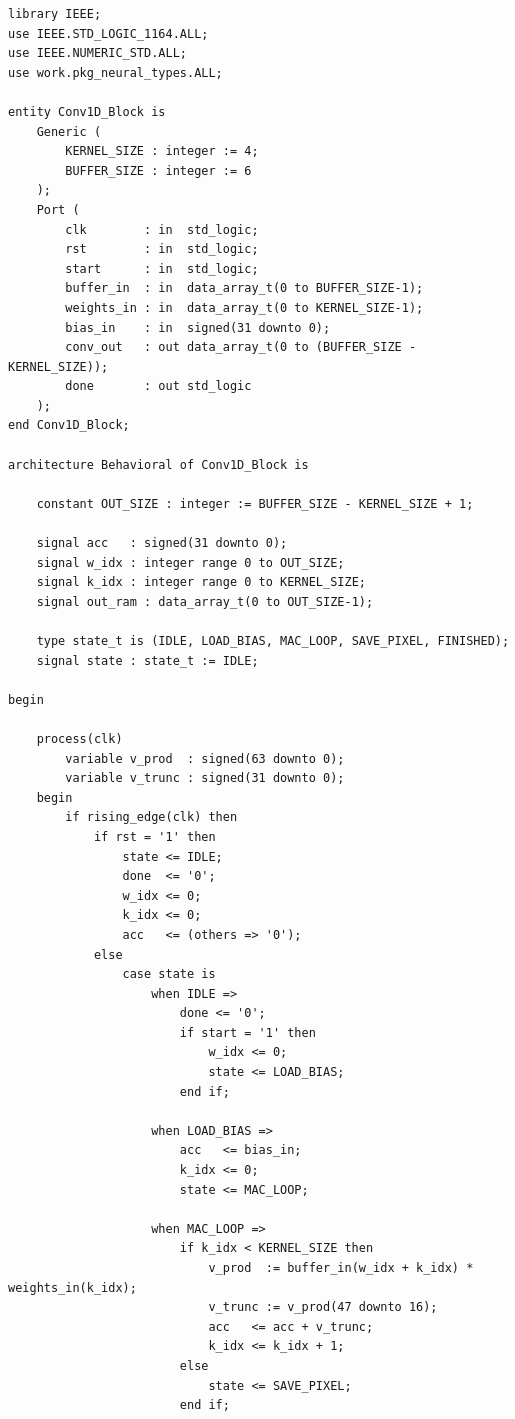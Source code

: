 \documentclass[a4paper,12pt]{article}
\begin{document}
\begin{lstlisting}[style=vhdlstyle,
    caption={C\'odigo VHDL do \texttt{Conv1D\_Block}.},
    label={lst:conv1d}]
library IEEE;
use IEEE.STD_LOGIC_1164.ALL;
use IEEE.NUMERIC_STD.ALL;
use work.pkg_neural_types.ALL;

entity Conv1D_Block is
    Generic (
        KERNEL_SIZE : integer := 4;
        BUFFER_SIZE : integer := 6
    );
    Port (
        clk        : in  std_logic;
        rst        : in  std_logic;
        start      : in  std_logic;
        buffer_in  : in  data_array_t(0 to BUFFER_SIZE-1);
        weights_in : in  data_array_t(0 to KERNEL_SIZE-1);
        bias_in    : in  signed(31 downto 0);
        conv_out   : out data_array_t(0 to (BUFFER_SIZE - KERNEL_SIZE));
        done       : out std_logic
    );
end Conv1D_Block;

architecture Behavioral of Conv1D_Block is

    constant OUT_SIZE : integer := BUFFER_SIZE - KERNEL_SIZE + 1;

    signal acc   : signed(31 downto 0);
    signal w_idx : integer range 0 to OUT_SIZE;
    signal k_idx : integer range 0 to KERNEL_SIZE;
    signal out_ram : data_array_t(0 to OUT_SIZE-1);

    type state_t is (IDLE, LOAD_BIAS, MAC_LOOP, SAVE_PIXEL, FINISHED);
    signal state : state_t := IDLE;

begin

    process(clk)
        variable v_prod  : signed(63 downto 0);
        variable v_trunc : signed(31 downto 0);
    begin
        if rising_edge(clk) then
            if rst = '1' then
                state <= IDLE;
                done  <= '0';
                w_idx <= 0;
                k_idx <= 0;
                acc   <= (others => '0');
            else
                case state is
                    when IDLE =>
                        done <= '0';
                        if start = '1' then
                            w_idx <= 0;
                            state <= LOAD_BIAS;
                        end if;

                    when LOAD_BIAS =>
                        acc   <= bias_in;
                        k_idx <= 0;
                        state <= MAC_LOOP;

                    when MAC_LOOP =>
                        if k_idx < KERNEL_SIZE then
                            v_prod  := buffer_in(w_idx + k_idx) * weights_in(k_idx);
                            v_trunc := v_prod(47 downto 16);
                            acc   <= acc + v_trunc;
                            k_idx <= k_idx + 1;
                        else
                            state <= SAVE_PIXEL;
                        end if;


\end{lstlisting}
\end{document}
